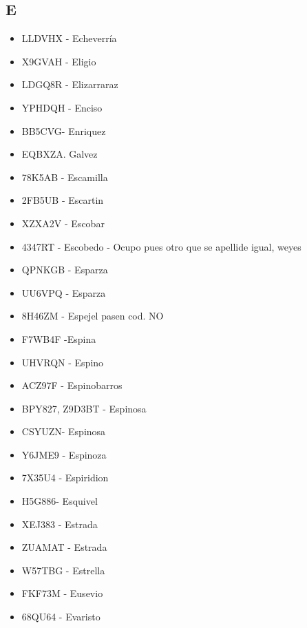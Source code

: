 \subsection*{E}
\begin{itemize}[leftmargin=*,nosep]
\item LLDVHX - Echeverría
\item X9GVAH  -  Eligio
\item LDGQ8R - Elizarraraz
\item YPHDQH - Enciso
\item BB5CVG- Enriquez
\item EQBXZA. Galvez
\item 78K5AB - Escamilla
\item 2FB5UB - Escartin
\item XZXA2V  -  Escobar
\item 4347RT  -  Escobedo - Ocupo pues otro que se apellide igual, weyes
\item QPNKGB - Esparza
\item UU6VPQ - Esparza
\item 8H46ZM - Espejel pasen cod. NO
\item F7WB4F -Espina
\item UHVRQN - Espino
\item ACZ97F - Espinobarros
\item BPY827, Z9D3BT - Espinosa
\item CSYUZN- Espinosa
\item Y6JME9  -  Espinoza
\item 7X35U4 - Espiridion
\item H5G886- Esquivel
\item XEJ383 - Estrada
\item ZUAMAT  -  Estrada
\item W57TBG - Estrella
\item FKF73M - Eusevio
\item 68QU64 - Evaristo
\end{itemize}

